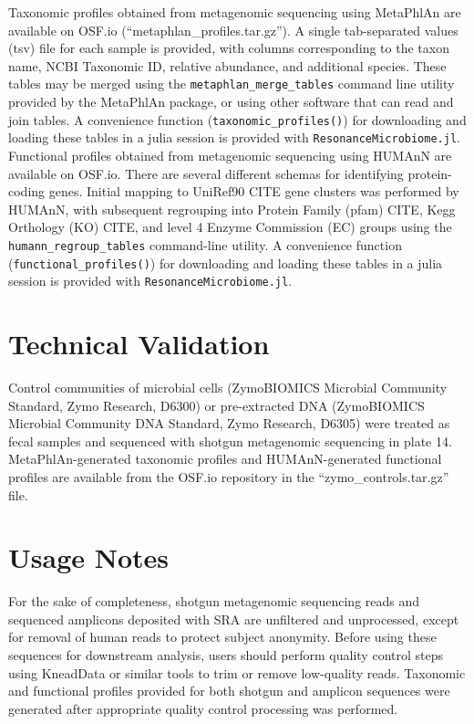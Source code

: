 \documentclass[fleqn,10pt]{wlscirep}
\begin{document}
Taxonomic profiles obtained from metagenomic sequencing using MetaPhlAn are available on OSF.io (“metaphlan_profiles.tar.gz”).
A single tab-separated values (tsv) file for each sample is provided,
with columns corresponding to the taxon name, NCBI Taxonomic ID, relative abundance, and additional species.
These tables may be merged using the \verb|metaphlan_merge_tables| command line utility provided by the MetaPhlAn package,
or using other software that can read and join tables.
A convenience function (\verb|taxonomic_profiles()|) for downloading and loading these tables in a julia session
is provided with \verb|ResonanceMicrobiome.jl|.
Functional profiles obtained from metagenomic sequencing using HUMAnN are available on OSF.io.
There are several different schemas for identifying protein-coding genes.
Initial mapping to UniRef90 {{CITE}} gene clusters was performed by HUMAnN,
with subsequent regrouping into Protein Family (pfam) {{CITE}}, Kegg Orthology (KO) {{CITE}},
and level 4 Enzyme Commission (EC) groups using the \verb|humann_regroup_tables| command-line utility.
A convenience function (\verb|functional_profiles()|) for downloading and loading these tables in a julia session
is provided with \verb|ResonanceMicrobiome.jl|.

\section*{Technical Validation}

Control communities of microbial cells (ZymoBIOMICS Microbial Community Standard, Zymo Research, D6300)
or pre-extracted DNA (ZymoBIOMICS Microbial Community DNA Standard, Zymo Research, D6305)
were treated as fecal samples and sequenced with shotgun metagenomic sequencing in plate 14.
MetaPhlAn-generated taxonomic profiles and HUMAnN-generated functional profiles
are available from the OSF.io repository in the “zymo_controls.tar.gz” file.

\section*{Usage Notes}

For the sake of completeness, shotgun metagenomic sequencing reads and sequenced amplicons deposited with SRA
are unfiltered and unprocessed, except for removal of human reads to protect subject anonymity.
Before using these sequences for downstream analysis, users should perform quality control steps
using KneadData or similar tools to trim or remove low-quality reads.
Taxonomic and functional profiles provided for both shotgun and amplicon sequences
were generated after appropriate quality control processing was performed. 
\end{document}
